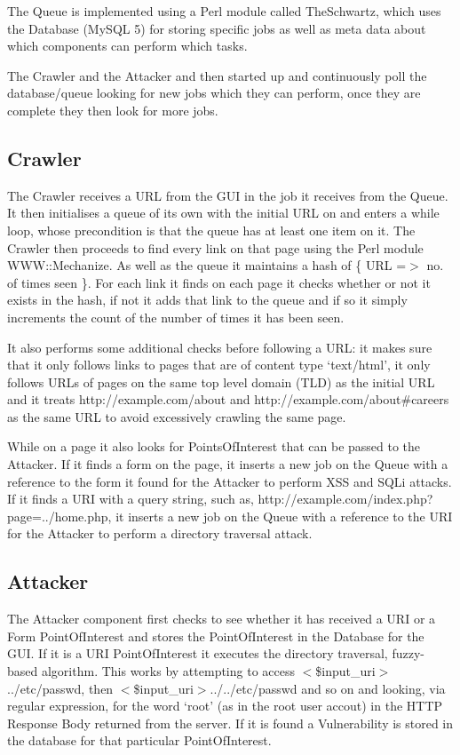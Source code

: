 \documentclass[12pt,a4paper]{article}
\begin{document}
The Queue is implemented using a Perl module called TheSchwartz, which uses the Database (MySQL 5) for storing specific jobs as well as meta data about which components can perform which tasks.

The Crawler and the Attacker and then started up and continuously poll the database/queue looking for new jobs which they can perform, once they are complete they then look for more jobs.

\subsection{Crawler}
The Crawler receives a URL from the GUI in the job it receives from the Queue.  It then initialises a queue of its own with the initial URL on and enters a while loop, whose precondition is that the queue has at least one item on it.  The Crawler then proceeds to find every link on that page using the Perl module WWW::Mechanize.  As well as the queue it maintains a hash of \{ URL =$>$ no. of times seen \}.  For each link it finds on each page it checks whether or not it exists in the hash, if not it adds that link to the queue and if so it simply increments the count of the number of times it has been seen.

It also performs some additional checks before following a URL: it makes sure that it only follows links to pages that are of content type `text/html',  it only follows URLs of pages on the same top level domain (TLD) as the initial URL and it treats http://example.com/about and http://example.com/about\#careers as the same URL to avoid excessively crawling the same page.

While on a page it also looks for PointsOfInterest that can be passed to the Attacker.  If it finds a form on the page, it inserts a new job on the Queue with a reference to the form it found for the Attacker to perform XSS and SQLi attacks.  If it finds a URI with a query string, such as, http://example.com/index.php?page=../home.php, it inserts a new job on the Queue with a reference to the URI for the Attacker to perform a directory traversal attack.

\subsection{Attacker}
The Attacker component first checks to see whether it has received a URI or a Form PointOfInterest and stores the PointOfInterest in the Database for the GUI.  If it is a URI PointOfInterest it executes the directory traversal, fuzzy-based algorithm.  This works by attempting to access $<$\$input\_uri$>$../etc/passwd, then $<$\$input\_uri$>$../../etc/passwd and so on and looking, via regular expression, for the word `root' (as in the root user accout) in the HTTP Response Body returned from the server.  If it is found a Vulnerability is stored in the database for that particular PointOfInterest.
\end{document}
